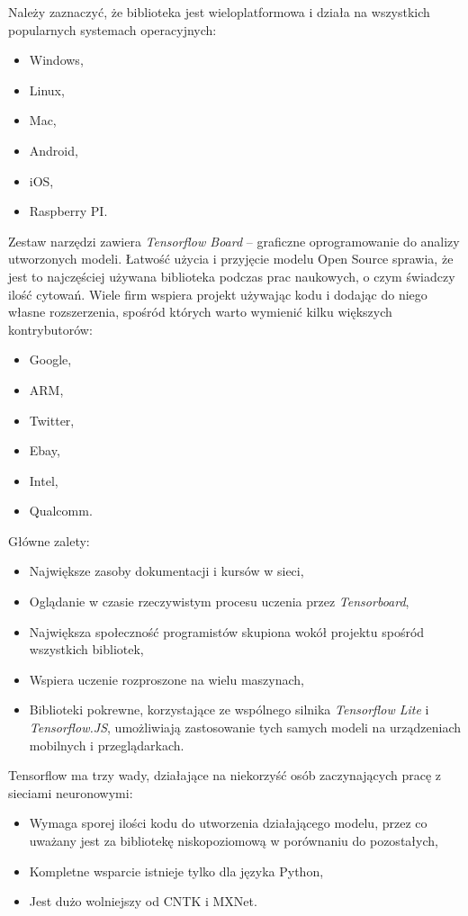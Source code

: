 \documentclass[12pt,a4paper,twoside,titlepage,openright]{book}
\begin{document}
Należy zaznaczyć, że biblioteka jest wieloplatformowa i działa na wszystkich popularnych systemach operacyjnych:
\begin{itemize}
\item Windows,
\item Linux,
\item Mac,
\item Android,
\item iOS,
\item Raspberry PI.
\end{itemize}

Zestaw narzędzi zawiera \textit{Tensorflow Board} -- graficzne oprogramowanie do analizy utworzonych modeli. Łatwość użycia i przyjęcie modelu Open Source sprawia, że jest to najczęściej używana biblioteka podczas prac naukowych, o czym świadczy ilość cytowań. \cite{siteTensorflowCitations} Wiele firm wspiera projekt używając kodu i dodając do niego własne rozszerzenia, spośród których warto wymienić kilku większych kontrybutorów:
\begin{itemize}
\item Google,
\item ARM,
\item Twitter,
\item Ebay,
\item Intel,
\item Qualcomm.
\end{itemize}

Główne zalety:
\begin{itemize}
\item Największe zasoby dokumentacji i kursów w sieci,
\item Oglądanie w czasie rzeczywistym procesu uczenia przez \textit{Tensorboard},
\item Największa społeczność programistów skupiona wokół projektu spośród wszystkich bibliotek,
\item Wspiera uczenie rozproszone na wielu maszynach,
\item Biblioteki pokrewne, korzystające ze wspólnego silnika \textit{Tensorflow Lite} i \textit{Tensorflow.JS}, umożliwiają zastosowanie tych samych modeli na urządzeniach mobilnych i przeglądarkach.
\end{itemize}

Tensorflow ma trzy wady, działające na niekorzyść osób zaczynających pracę z sieciami neuronowymi:
\begin{itemize}
\item Wymaga sporej ilości kodu do utworzenia działającego modelu, przez co uważany jest za bibliotekę niskopoziomową w porównaniu do pozostałych,
\item Kompletne wsparcie istnieje tylko dla języka Python, 
\item Jest dużo wolniejszy od CNTK i MXNet.\cite{DBLP:journals/corr/ShiWXC16}
\end{itemize}
\end{document}
